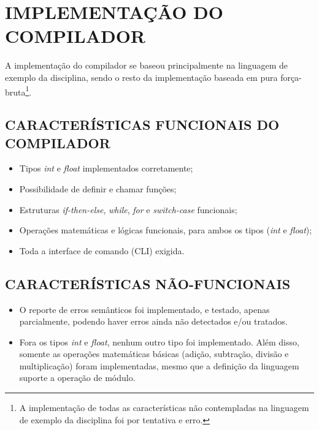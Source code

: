 \section{\normalsize IMPLEMENTAÇÃO DO COMPILADOR}
	A implementação do compilador se baseou principalmente na linguagem de exemplo da disciplina, sendo o resto da implementação baseada em pura força-bruta\footnote{A implementação de todas as características não contempladas na linguagem de exemplo da disciplina foi por tentativa e erro.}.
	
	\subsection{\normalsize CARACTERÍSTICAS FUNCIONAIS DO COMPILADOR}
	\begin{itemize}
		\item Tipos \textit{int} e \textit{float} implementados corretamente;
		\item Possibilidade de definir e chamar funções;
		\item Estruturas \textit{if-then-else}, \textit{while}, \textit{for} e \textit{switch-case} funcionais;
		\item Operações matemáticas e lógicas funcionais, para ambos os tipos (\textit{int} e \textit{float});
		\item Toda a interface de comando (CLI) exigida.
		
	\end{itemize}
	
	\subsection{\normalsize CARACTERÍSTICAS NÃO-FUNCIONAIS}
	\begin{itemize}
		\item O reporte de erros semânticos foi implementado, e testado, apenas parcialmente, podendo haver erros ainda não detectados e/ou tratados.
		\item Fora os tipos \textit{int} e \textit{float}, nenhum outro tipo foi implementado. Além disso, somente as operações matemáticas básicas (adição, subtração, divisão e multiplicação) foram implementadas, mesmo que a definição da linguagem suporte a operação de módulo.
	\end{itemize}
	
